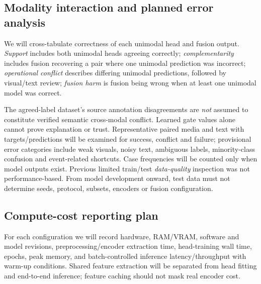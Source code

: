 \documentclass[11pt,a4paper]{article}
\begin{document}
\subsection{Modality interaction and planned error analysis}
We will cross-tabulate correctness of each unimodal head and fusion output. \emph{Support} includes both unimodal heads agreeing correctly; \emph{complementarity} includes fusion recovering a pair where one unimodal prediction was incorrect; \emph{operational conflict} describes differing unimodal predictions, followed by visual/text review; \emph{fusion harm} is fusion being wrong when at least one unimodal model was correct.

The agreed-label dataset's source annotation disagreements are \emph{not} assumed to constitute verified semantic cross-modal conflict. Learned gate values alone cannot prove explanation or trust. Representative paired media and text with targets/predictions will be examined for success, conflict and failure; provisional error categories include weak visuals, noisy text, ambiguous labels, minority-class confusion and event-related shortcuts. Case frequencies will be counted only when model outputs exist. Previous limited train/test \emph{data-quality} inspection was not performance-based. From model development onward, test data must not determine seeds, protocol, subsets, encoders or fusion configuration.

\subsection{Compute-cost reporting plan}
For each configuration we will record hardware, RAM/VRAM, software and model revisions, preprocessing/encoder extraction time, head-training wall time, epochs, peak memory, and batch-controlled inference latency/throughput with warm-up conditions. Shared feature extraction will be separated from head fitting and end-to-end inference; feature caching should not mask real encoder cost.
\end{document}

